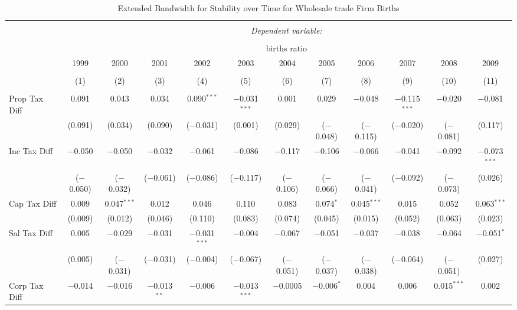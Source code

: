 
\begin{table}[!htbp] \centering 
  \caption{Extended Bandwidth for Stability over Time for  Wholesale trade Firm Births} 
  \label{42year} 
\small 
\begin{tabular}{@{\extracolsep{5pt}}lccccccccccc} 
\\[-1.8ex]\hline 
\hline \\[-1.8ex] 
 & \multicolumn{11}{c}{\textit{Dependent variable:}} \\ 
\cline{2-12} 
\\[-1.8ex] & \multicolumn{11}{c}{births ratio} \\ 
 & 1999 & 2000 & 2001 & 2002 & 2003 & 2004 & 2005 & 2006 & 2007 & 2008 & 2009 \\ 
\\[-1.8ex] & (1) & (2) & (3) & (4) & (5) & (6) & (7) & (8) & (9) & (10) & (11)\\ 
\hline \\[-1.8ex] 
 Prop Tax Diff & 0.091 & 0.043 & 0.034 & 0.090$^{***}$ & $-$0.031$^{***}$ & 0.001 & 0.029 & $-$0.048 & $-$0.115$^{***}$ & $-$0.020 & $-$0.081 \\ 
  & (0.091) & (0.034) & (0.090) & ($-$0.031) & (0.001) & (0.029) & ($-$0.048) & ($-$0.115) & ($-$0.020) & ($-$0.081) & (0.117) \\ 
  Inc Tax Diff & $-$0.050 & $-$0.050 & $-$0.032 & $-$0.061 & $-$0.086 & $-$0.117 & $-$0.106 & $-$0.066 & $-$0.041 & $-$0.092 & $-$0.073$^{***}$ \\ 
  & ($-$0.050) & ($-$0.032) & ($-$0.061) & ($-$0.086) & ($-$0.117) & ($-$0.106) & ($-$0.066) & ($-$0.041) & ($-$0.092) & ($-$0.073) & (0.026) \\ 
  Cap Tax Diff & 0.009 & 0.047$^{***}$ & 0.012 & 0.046 & 0.110 & 0.083 & 0.074$^{*}$ & 0.045$^{***}$ & 0.015 & 0.052 & 0.063$^{***}$ \\ 
  & (0.009) & (0.012) & (0.046) & (0.110) & (0.083) & (0.074) & (0.045) & (0.015) & (0.052) & (0.063) & (0.023) \\ 
  Sal Tax Diff & 0.005 & $-$0.029 & $-$0.031 & $-$0.031$^{***}$ & $-$0.004 & $-$0.067 & $-$0.051 & $-$0.037 & $-$0.038 & $-$0.064 & $-$0.051$^{*}$ \\ 
  & (0.005) & ($-$0.031) & ($-$0.031) & ($-$0.004) & ($-$0.067) & ($-$0.051) & ($-$0.037) & ($-$0.038) & ($-$0.064) & ($-$0.051) & (0.027) \\ 
  Corp Tax Diff & $-$0.014 & $-$0.016 & $-$0.013$^{**}$ & $-$0.006 & $-$0.013$^{***}$ & $-$0.0005 & $-$0.006$^{*}$ & 0.004 & 0.006 & 0.015$^{***}$ & 0.002 \\ 

\end{tabular}
\end{table}
